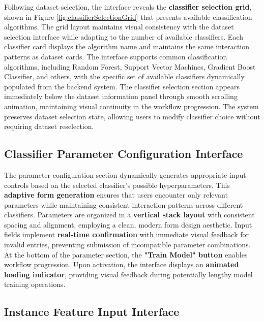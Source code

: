 Following dataset selection, the interface reveals the \textbf{classifier selection grid}, shown in Figure \ref{fig:classifierSelectionGrid} that presents available classification algorithms. The grid layout maintains visual consistency with the dataset selection interface while adapting to the number of available classifiers.
% 
Each classifier card displays the algorithm name and maintains the same interaction patterns as dataset cards. The interface supports common classification algorithms, including Random Forest, Support Vector Machines, Gradient Boost Classifier, and others, with the specific set of available classifiers dynamically populated from the backend system.
% 
The classifier selection section appears immediately below the dataset information panel through smooth scrolling animation, maintaining visual continuity in the workflow progression. The system preserves dataset selection state, allowing users to modify classifier choice without requiring dataset reselection.

\subsection{Classifier Parameter Configuration Interface}

The parameter configuration section dynamically generates appropriate input controls based on the selected classifier's possible hyperparameters. This \textbf{adaptive form generation} ensures that users encounter only relevant parameters while maintaining consistent interaction patterns across different classifiers.
% 
Parameters are organized in a \textbf{vertical stack layout} with consistent spacing and alignment, employing a clean, modern form design aesthetic. Input fields implement \textbf{real-time confirmation} with immediate visual feedback for invalid entries, preventing submission of incompatible parameter combinations.
% 
At the bottom of the parameter section, the \textbf{"Train Model" button} enables workflow progression. Upon activation, the interface displays an \textbf{animated loading indicator}, providing visual feedback during potentially lengthy model training operations.

\subsection{Instance Feature Input Interface}


